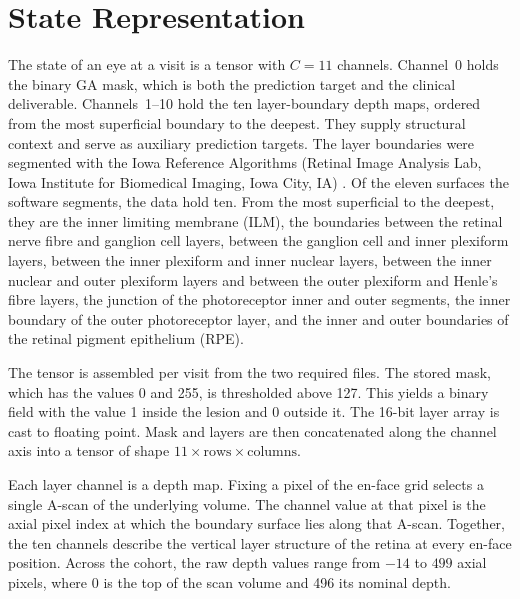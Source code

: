 \section{State Representation}
\label{sec:data:state}
\label{sec:background:ga-oct:state-rep}

The state of an eye at a visit is a tensor with $C = 11$ channels.
Channel~0 holds the binary GA mask, which is both the prediction target and
the clinical deliverable. Channels~1--10 hold the ten layer-boundary depth
maps, ordered from the most superficial boundary to the deepest. They
supply structural context and serve as auxiliary prediction targets.
The layer boundaries were segmented with the Iowa Reference Algorithms
(Retinal Image Analysis Lab, Iowa Institute for Biomedical Imaging, Iowa
City, IA) \citep{Li2006,Garvin2009,Abramoff2010}. Of the eleven surfaces
the software segments, the data hold ten. From the most superficial to the
deepest, they are the inner limiting membrane (ILM), the boundaries
between the retinal nerve fibre and ganglion cell layers, between the
ganglion cell and inner plexiform layers, between the inner plexiform and
inner nuclear layers, between the inner nuclear and outer plexiform layers
and between the outer plexiform and Henle's fibre layers, the junction of
the photoreceptor inner and outer segments, the inner boundary of the
outer photoreceptor layer, and the inner and outer boundaries of the
retinal pigment epithelium (RPE).

The tensor is assembled per visit from the two required files. The
stored mask, which has the values 0 and 255, is thresholded above 127.
This yields a binary field with the value 1 inside the lesion and 0
outside it. The 16-bit layer array is cast to floating point. Mask and
layers are then concatenated along the channel axis into a tensor of
shape $11 \times \text{rows} \times \text{columns}$.

Each layer channel is a depth map. Fixing a pixel of the en-face grid
selects a single A-scan of the underlying volume. The channel value at
that pixel is the axial pixel index at which the boundary surface lies
along that A-scan. Together, the ten channels describe the vertical
layer structure of the retina at every en-face position. Across the
cohort, the raw depth values range from $-14$ to $499$ axial pixels,
where 0 is the top of the scan volume and 496 its nominal depth.

